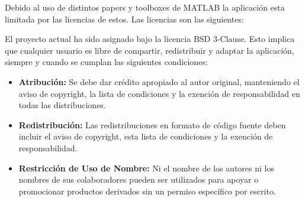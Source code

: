 Debido al uso de distintos papers y toolboxes de MATLAB la aplicación esta limitada por las licencias de estos. Las licencias son las siguientes:

\newpage


El proyecto actual ha sido asignado bajo la licencia BSD 3-Clause. Esto implica que cualquier usuario es libre de compartir, redistribuir y adaptar la aplicación, siempre y cuando se cumplan las siguientes condiciones:

\begin{itemize}
  \item \textbf{Atribución:} Se debe dar crédito apropiado al autor original, manteniendo el aviso de copyright, la lista de condiciones y la exención de responsabilidad en todas las distribuciones.
  \item \textbf{Redistribución:} Las redistribuciones en formato de código fuente deben incluir el aviso de copyright, esta lista de condiciones y la exención de responsabilidad.
  \item \textbf{Restricción de Uso de Nombre:} Ni el nombre de los autores ni los nombres de sus colaboradores pueden ser utilizados para apoyar o promocionar productos derivados sin un permiso específico por escrito.
\end{itemize}


